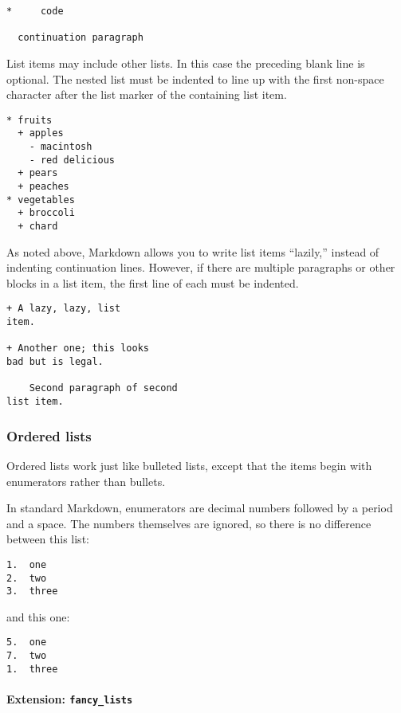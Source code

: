 \documentclass[]{article}
\begin{document}
\begin{verbatim}
*     code

  continuation paragraph
\end{verbatim}

List items may include other lists. In this case the preceding blank
line is optional. The nested list must be indented to line up with the
first non-space character after the list marker of the containing list
item.

\begin{verbatim}
* fruits
  + apples
    - macintosh
    - red delicious
  + pears
  + peaches
* vegetables
  + broccoli
  + chard
\end{verbatim}

As noted above, Markdown allows you to write list items ``lazily,''
instead of indenting continuation lines. However, if there are multiple
paragraphs or other blocks in a list item, the first line of each must
be indented.

\begin{verbatim}
+ A lazy, lazy, list
item.

+ Another one; this looks
bad but is legal.

    Second paragraph of second
list item.
\end{verbatim}

\hypertarget{ordered-lists}{%
\subsubsection{Ordered lists}\label{ordered-lists}}

Ordered lists work just like bulleted lists, except that the items begin
with enumerators rather than bullets.

In standard Markdown, enumerators are decimal numbers followed by a
period and a space. The numbers themselves are ignored, so there is no
difference between this list:

\begin{verbatim}
1.  one
2.  two
3.  three
\end{verbatim}

and this one:

\begin{verbatim}
5.  one
7.  two
1.  three
\end{verbatim}

\hypertarget{extension-fancy_lists}{%
\paragraph{\texorpdfstring{Extension:
\texttt{fancy\_lists}}{Extension: fancy\_lists}}\label{extension-fancy_lists}}
\end{document}
